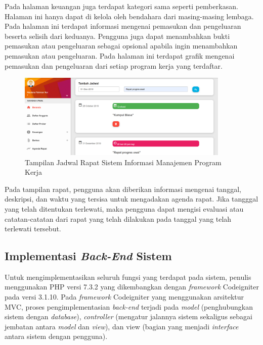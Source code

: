 Pada halaman keuangan juga terdapat kategori sama seperti pemberkasan. Halaman ini hanya dapat di kelola oleh bendahara dari masing-masing lembaga. Pada halaman ini terdapat informasi mengenai pemasukan dan pengeluaran beserta selisih dari keduanya. Pengguna juga dapat menambahkan bukti pemasukan atau pengeluaran sebagai opsional apabila ingin menambahkan pemasukan atau pengeluaran. Pada halaman ini terdapat grafik mengenai pemasukan dan pengeluaran dari setiap program kerja yang terdaftar.

\begin{figure}[H]
	\centering
	\includegraphics[width=0.9\textwidth]{gambar/interface_rapat}
	\caption{ Tampilan Jadwal Rapat Sistem Informasi Manajemen Program Kerja}
	\label{Tampilan_Rapat}
\end{figure}

Pada tampilan rapat, pengguna akan diberikan informasi mengenai tanggal, deskripsi, dan waktu yang tersisa untuk mengadakan agenda rapat. Jika tangggal yang telah ditentukan terlewati, maka pengguna dapat mengisi evaluasi atau catatan-catatan dari rapat yang telah dilakukan pada tanggal yang telah terlewati tersebut.

\subsection{Implementasi \textit{Back-End} Sistem}

Untuk mengimplementasikan seluruh fungsi yang terdapat pada sistem, penulis menggunakan PHP versi 7.3.2 yang dikembangkan dengan \textit{framework} Codeigniter pada versi 3.1.10. Pada \textit{framework} Codeigniter yang menggunakan arsitektur MVC, proses pengimplementasian \textit{back-end} terjadi pada \textit{model} (penghubungkan sistem dengan \textit{database}), \textit{controller} (mengatur jalannya sistem sekaligus sebagai jembatan antara \textit{model} dan \textit{view}), dan view (bagian yang menjadi \textit{interface} antara sistem dengan pengguna). 